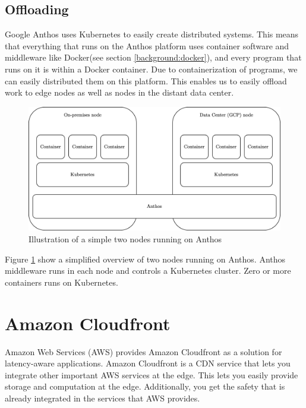 \subsection{Offloading}
Google Anthos uses Kubernetes\cite{noauthor_production-grade_nodate} to easily create distributed systems\cite{noauthor_anthos_nodate}. This means that everything that runs on the Anthos platform uses container software and middleware like Docker(see section \ref{background:docker}), and every program that runs on it is within a Docker container. Due to containerization of programs, we can easily distributed them on this platform. This enables us to easily offload work to edge nodes as well as nodes in the distant data center.
\begin{figure}[t]
    \centering
    \includegraphics[scale=0.9]{chapters/architectures/figures/anthos_architecture.png}
    \caption{Illustration of a simple two nodes running on Anthos}
    \label{fig:Anthos_architecture}
\end{figure}
Figure \ref{fig:Anthos_architecture} show a simplified overview of two nodes running on Anthos. Anthos middleware runs in each node and controls a Kubernetes cluster. Zero or more containers runs on Kubernetes.



\section{Amazon Cloudfront}
Amazon Web Services (AWS) provides Amazon Cloudfront as a solution for latency-aware applications\cite{noauthor_production-grade_nodate}. Amazon Cloudfront is a CDN service that lets you integrate other important AWS services at the edge. This lets you easily provide storage and computation at the edge. Additionally, you get the safety that is already integrated in the services that AWS provides. 

